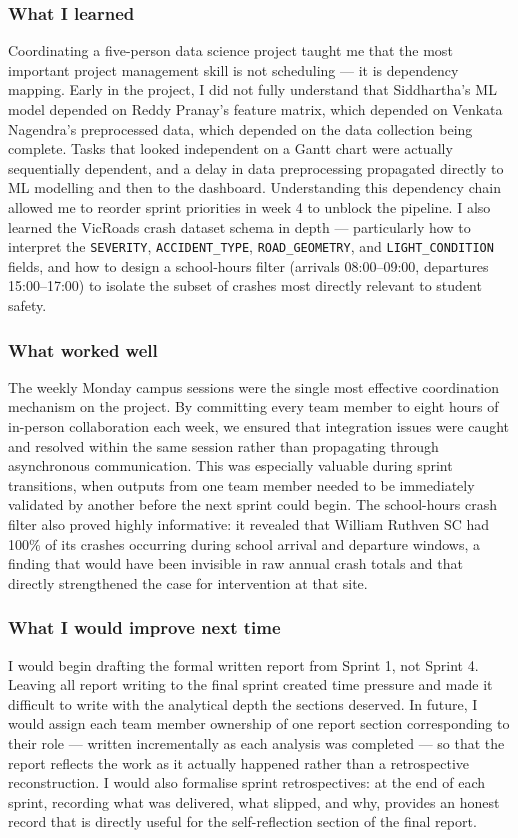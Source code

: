 \documentclass[11pt,a4paper]{article}
\begin{document}
\subsubsection*{What I learned}
Coordinating a five-person data science project taught me that the most important project management skill is not scheduling — it is dependency mapping. Early in the project, I did not fully understand that Siddhartha's ML model depended on Reddy Pranay's feature matrix, which depended on Venkata Nagendra's preprocessed data, which depended on the data collection being complete. Tasks that looked independent on a Gantt chart were actually sequentially dependent, and a delay in data preprocessing propagated directly to ML modelling and then to the dashboard. Understanding this dependency chain allowed me to reorder sprint priorities in week 4 to unblock the pipeline. I also learned the VicRoads crash dataset schema in depth — particularly how to interpret the \texttt{SEVERITY}, \texttt{ACCIDENT\_TYPE}, \texttt{ROAD\_GEOMETRY}, and \texttt{LIGHT\_CONDITION} fields, and how to design a school-hours filter (arrivals 08:00--09:00, departures 15:00--17:00) to isolate the subset of crashes most directly relevant to student safety.

\subsubsection*{What worked well}
The weekly Monday campus sessions were the single most effective coordination mechanism on the project. By committing every team member to eight hours of in-person collaboration each week, we ensured that integration issues were caught and resolved within the same session rather than propagating through asynchronous communication. This was especially valuable during sprint transitions, when outputs from one team member needed to be immediately validated by another before the next sprint could begin. The school-hours crash filter also proved highly informative: it revealed that William Ruthven SC had 100\% of its crashes occurring during school arrival and departure windows, a finding that would have been invisible in raw annual crash totals and that directly strengthened the case for intervention at that site.

\subsubsection*{What I would improve next time}
I would begin drafting the formal written report from Sprint 1, not Sprint 4. Leaving all report writing to the final sprint created time pressure and made it difficult to write with the analytical depth the sections deserved. In future, I would assign each team member ownership of one report section corresponding to their role — written incrementally as each analysis was completed — so that the report reflects the work as it actually happened rather than a retrospective reconstruction. I would also formalise sprint retrospectives: at the end of each sprint, recording what was delivered, what slipped, and why, provides an honest record that is directly useful for the self-reflection section of the final report.
\end{document}
